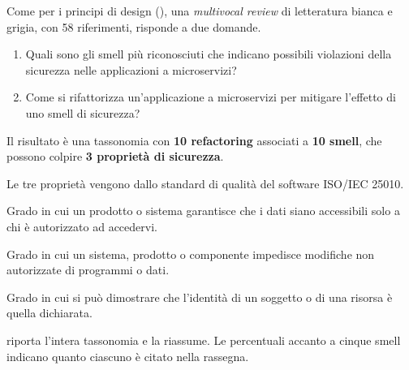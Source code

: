Come per i principi di design (), una \emph{multivocal review} di letteratura bianca e grigia,
con 58 riferimenti, risponde a due domande.
\begin{enumerate}
  \item Quali sono gli smell più riconosciuti che indicano possibili violazioni della sicurezza nelle applicazioni a
    microservizi?
  \item Come si rifattorizza un'applicazione a microservizi per mitigare l'effetto di uno smell di sicurezza?
\end{enumerate}
Il risultato è una tassonomia con \textbf{10 refactoring} associati a \textbf{10 smell}, che possono colpire
\textbf{3 proprietà di sicurezza}.

\begin{definizione}
Le tre proprietà vengono dallo standard di qualità del software ISO/IEC 25010.
\begin{description}[leftmargin=0pt, style=unboxed]
  \item[Confidentiality.] Grado in cui un prodotto o sistema garantisce che i dati siano accessibili solo a chi è
    autorizzato ad accedervi.
  \item[Integrity.] Grado in cui un sistema, prodotto o componente impedisce modifiche non autorizzate di programmi o
    dati.
  \item[Authenticity.] Grado in cui si può dimostrare che l'identità di un soggetto o di una risorsa è quella
    dichiarata.
\end{description}
\end{definizione}

 riporta l'intera tassonomia e  la riassume. Le percentuali
accanto a cinque smell indicano quanto ciascuno è citato nella rassegna.


